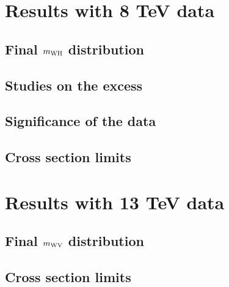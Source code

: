 \chapter{Results with 8 TeV data}
\label{ch:results8}

\section{Final $m_{\rm WH}$ distribution}
\section{Studies on the excess}
\section{Significance of the data}
\section{Cross section limits}

\chapter{Results with 13 TeV data}
\label{ch:results13}

\section{Final $m_{\rm WV}$ distribution}
\section{Cross section limits}



